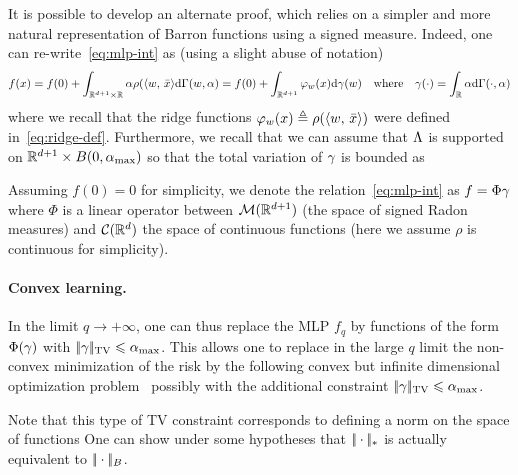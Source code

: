 It is possible to develop an alternate proof, which relies on a simpler and more natural representation of Barron functions using a signed measure. Indeed, one can re-write~\eqref{eq:mlp-int} as (using a slight abuse of notation)
\begin{equation}\label{eq:mlp-int}
    f(x) = f(0) + \int_{\mathbb{R}^{d+1} \times \mathbb{R}} \alpha \rho(\langle w,\,\bar x\rangle \mathrm{d}\Gamma(w,\alpha)
    = 
    f(0) + \int_{\mathbb{R}^{d+1}}  \varphi_w(x) \mathrm{d}\gamma(w)
    \quad \text{where} \quad
    \gamma(\cdot) = \int_{\mathbb{R}} \alpha \mathrm{d}\Gamma(\cdot,\alpha)
\end{equation}
where we recall that the ridge functions $\varphi_w(x) \triangleq \rho( \langle w,\,\bar x\rangle )$ were defined in~\eqref{eq:ridge-def}. 
%
Furthermore, we recall that we can assume that $\Lambda$ is supported on $\mathbb{R}^{d+1} \times B(0,\alpha_{\max})$ so that the total variation of $\gamma$ is bounded as 

Assuming $f(0)=0$ for simplicity, we denote the relation~\eqref{eq:mlp-int} as $f = \Phi \gamma$ where $\Phi$ is a linear operator between $\mathcal{M}(\mathbb{R}^{d+1})$ (the space of signed Radon measures) and $\mathcal{C}(\mathbb{R}^{d})$ the space of continuous functions (here we assume $\rho$ is continuous for simplicity). 

\paragraph{Convex learning.}

In the limit $q \rightarrow +\infty$, one can thus replace the MLP $f_q$ by functions of the form $\Phi(\gamma)$ with $|\!| \gamma |\!|_{\operatorname{TV}} \leqslant \alpha_{\max}$.
%
This allows one to replace in the large $q$ limit the non-convex minimization of the risk
by the following convex but infinite dimensional optimization problem~\cite{bach2017breaking}
possibly with the additional constraint $|\!| \gamma |\!|_{\operatorname{TV}} \leqslant \alpha_{\max}$.

Note that this type of TV constraint corresponds to defining a norm on the space of functions
One can show under some hypotheses that $|\!| \cdot |\!|_*$ is actually equivalent to $|\!| \cdot |\!|_B$.

